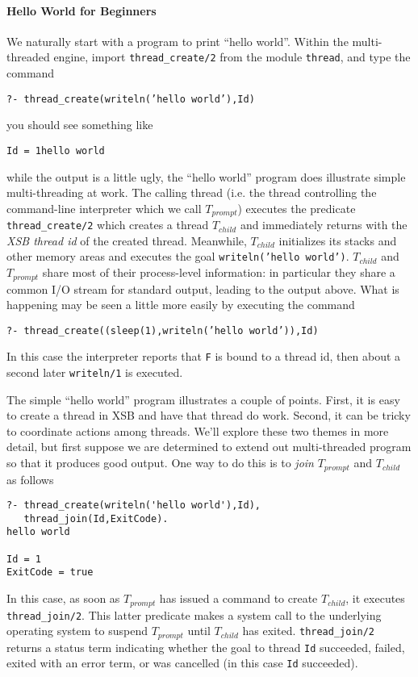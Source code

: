 \paragraph{Hello World for Beginners}
%
We naturally start with a program to print ``hello world''.  Within
the multi-threaded engine, import {\tt thread\_create/2} from the
module {\tt thread}, and type the command
\begin{center} 
{\tt ?- thread\_create(writeln('hello world'),Id)} 
\end{center} 
you should see something like 
\begin{center} 
{\tt Id = 1hello world} 
\end{center} 
%
while the output is a little ugly, the ``hello world'' program does
illustrate simple multi-threading at work.  The calling thread
(i.e. the thread controlling the command-line interpreter which we
call $T_{prompt}$) executes the predicate {\tt thread\_create/2} which
creates a thread $T_{child}$ and immediately returns with the {\em XSB
  thread id} of the created thread.  Meanwhile, $T_{child}$
initializes its stacks and other memory areas and executes the goal
{\tt writeln('hello world')}.  $T_{child}$ and $T_{prompt}$ share most
of their process-level information: in particular they share a common
I/O stream for standard output, leading to the output above.  What is
happening may be seen a little more easily by executing the command
%
\begin{center} 
{\tt ?- thread\_create((sleep(1),writeln('hello world')),Id)} 
\end{center} 
%
In this case the interpreter reports that {\tt F} is bound to a thread
id, then about a second later {\tt writeln/1} is executed.  

The simple ``hello world'' program illustrates a couple of points.
First, it is easy to create a thread in XSB and have that thread do
work.  Second, it can be tricky to coordinate actions among threads.
We'll explore these two themes in more detail, but first suppose we
are determined to extend out multi-threaded program so that it
produces good output.  One way to do this is to {\em join}
$T_{prompt}$ and $T_{child}$ as follows 
%
\begin{verbatim}
?- thread_create(writeln('hello world'),Id),
   thread_join(Id,ExitCode).
hello world

Id = 1
ExitCode = true
\end{verbatim}
%
In this case, as soon as $T_{prompt}$ has issued a command to create
$T_{child}$, it executes {\tt thread\_join/2}.  This latter predicate
makes a system call to the underlying operating system to suspend
$T_{prompt}$ until $T_{child}$ has exited.  {\tt thread\_join/2}
returns a status term indicating whether the goal to thread {\tt Id}
succeeded, failed, exited with an error term, or was cancelled (in
this case {\tt Id} succeeded).

